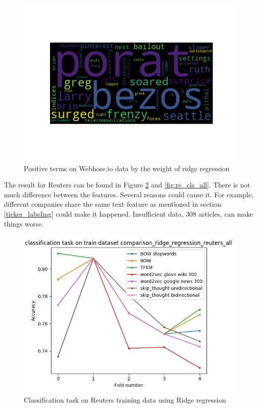 \documentclass[sigconf]{acmart}
\begin{document}
\begin{figure}
  \includegraphics[width=\linewidth]{../../picture/wordCloud/ridge_regression_positive_(webhose,_bow_noun,_verb_and_adj).png}
  \caption{Positive terms on Webhose.io data by the weight of ridge regression}
  \label{fig:web_pos_rid}
\end{figure}

The result for Reuters can be found in Figure \ref{fig:re_tr_cls_all} and \ref{fig:re_cls_all}. There is not much difference between the features. Several reasons could cause it. For example, different companies share the same text feature as mentioned in section \ref{ticker_labeling} could make it happened. Insufficient data, 308 articles, can make things worse.

\begin{figure}
  \includegraphics[width=\linewidth]{../../picture/experiment/classification_train_comparison_ridge_regression_reuters_all.png}
  \caption{Classification task on Reuters training data using Ridge regression}
  \label{fig:re_tr_cls_all}
\end{figure}
\end{document}
